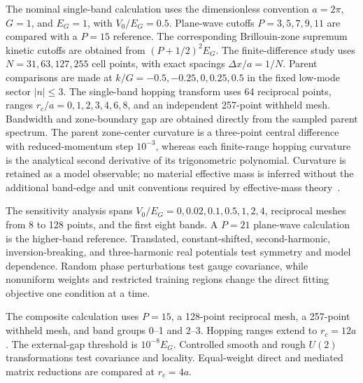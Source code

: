 The nominal single-band calculation uses the dimensionless convention
$a=2\pi$, $G=1$, and $E_G=1$, with $V_0/E_G=0.5$. Plane-wave cutoffs
$P=3,5,7,9,11$ are compared with a $P=15$ reference. The corresponding
Brillouin-zone supremum kinetic cutoffs are obtained from
$(P+1/2)^2E_G$. The finite-difference study uses $N=31,63,127,255$ cell points,
with exact spacings $\Delta x/a=1/N$. Parent comparisons are made at
$k/G=-0.5,-0.25,0,0.25,0.5$ in the fixed low-mode sector $|n|\leq3$.
The single-band hopping transform uses 64 reciprocal points, ranges
$r_c/a=0,1,2,3,4,6,8$, and an independent 257-point withheld mesh. Bandwidth and
zone-boundary gap are obtained directly from the sampled parent spectrum. The parent
zone-center curvature is a three-point central difference with reduced-momentum step
$10^{-3}$, whereas each finite-range hopping curvature is the analytical second
derivative of its trigonometric polynomial. Curvature is retained as a model
observable; no material effective mass is inferred without the additional band-edge
and unit conventions required by effective-mass theory~\cite{luttingerKohn1955}.

The sensitivity analysis spans $V_0/E_G=0,0.02,0.1,0.5,1,2,4$, reciprocal
meshes from 8 to 128 points, and the first eight bands. A $P=21$ plane-wave
calculation is the higher-band reference. Translated, constant-shifted,
second-harmonic, inversion-breaking, and three-harmonic real potentials test
symmetry and model dependence. Random phase perturbations test gauge covariance,
while nonuniform weights and restricted training regions change the direct
fitting objective one condition at a time.

The composite calculation uses $P=15$, a 128-point reciprocal mesh, a 257-point
withheld mesh, and band groups 0--1 and 2--3. Hopping ranges extend to
$r_c=12a$. The external-gap threshold is $10^{-8}E_G$. Controlled smooth and
rough $U(2)$ transformations test covariance and locality. Equal-weight direct
and mediated matrix reductions are compared at $r_c=4a$.

